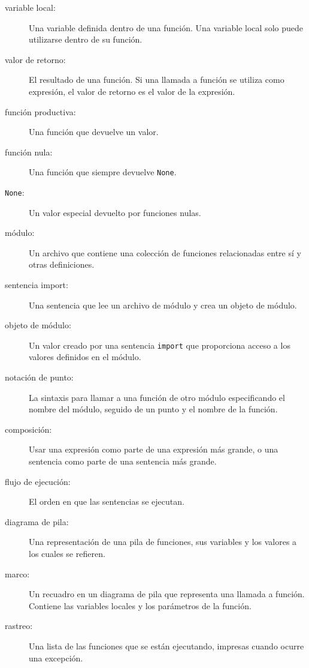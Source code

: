 \documentclass[10pt]{book}
\begin{document}
\begin{description}
\item[variable local:]  Una variable definida dentro de una función. Una variable
local solo puede utilizarse dentro de su función.

\item[valor de retorno:]  El resultado de una función.  Si una llamada a función
se utiliza como expresión, el valor de retorno es el valor de
la expresión.

\item[función productiva:] Una función que devuelve un valor.

\item[función nula:] Una función que siempre devuelve {\tt None}.

\item[{\tt None}:]  Un valor especial devuelto por funciones nulas.

\item[módulo:] Un archivo que contiene una
colección de funciones relacionadas entre sí y otras definiciones.

\item[sentencia import:] Una sentencia que lee un archivo de módulo y crea
un objeto de módulo.

\item[objeto de módulo:] Un valor creado por una sentencia {\tt import}
que proporciona acceso a los valores definidos en el módulo.

\item[notación de punto:]  La sintaxis para llamar a una función de otro
módulo especificando el nombre del módulo, seguido de un punto y
el nombre de la función.

\item[composición:] Usar una expresión como parte de una expresión más grande,
o una sentencia como parte de una sentencia más grande.

\item[flujo de ejecución:]  El orden en que las sentencias se ejecutan.

\item[diagrama de pila:]  Una representación de una pila de funciones,
sus variables y los valores a los cuales se refieren.

\item[marco:]  Un recuadro en un diagrama de pila que representa una llamada a función.
Contiene las variables locales y los parámetros de la función.

\item[rastreo:]  Una lista de las funciones que se están ejecutando,
impresas cuando ocurre una excepción.


\end{description}
\end{document}
